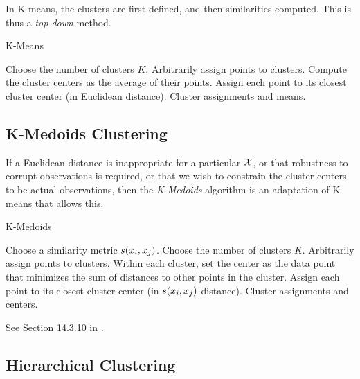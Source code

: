 In K-means, the clusters are first defined, and then similarities computed. This is thus a \emph{top-down} method.

\begin{algorithm}[H]
\caption{K-Means}
\label{algo:kmeans}
\begin{algorithmic}
\State Choose the number of clusters $K$.
\State Arbitrarily assign points to clusters.
	\State Compute the cluster centers as the average of their points.
	\State Assign each point to its closest cluster center (in Euclidean distance).
\EndWhile
\State \Return Cluster assignments and means.
\end{algorithmic}
\end{algorithm}





\subsection{K-Medoids Clustering}
\label{sec:k_medoids}


If a Euclidean distance is inappropriate for a particular $\mathcal{X}$, or that robustness to corrupt observations is required, or that we wish to constrain the cluster centers to be actual observations, then the \emph{K-Medoids} algorithm is an adaptation of K-means that allows this.

\begin{algorithm}[H]
\caption{K-Medoids}
\begin{algorithmic}
\State Choose a similarity metric $s(x_i,x_j)$.
\State Choose the number of clusters $K$.
\State Arbitrarily assign points to clusters.
	\State Within each cluster, set the center as the data point that minimizes the sum of distances to other points in the cluster.
	\State Assign each point to its closest cluster center (in $s(x_i,x_j)$ distance).
\EndWhile
\State \Return Cluster assignments and centers.
\end{algorithmic}
\end{algorithm}


See Section 14.3.10 in \cite{hastie_elements_2003}.








\subsection{Hierarchical Clustering}
\label{sec:hierarchical}

